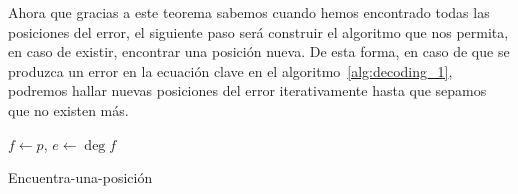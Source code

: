 Ahora que gracias a este teorema sabemos cuando hemos encontrado todas las posiciones del error, el siguiente paso será construir el algoritmo que nos permita, en caso de existir, encontrar una posición nueva. De esta forma, en caso de que se produzca un error en la ecuación clave en el algoritmo~\ref{alg:decoding_1}, podremos hallar nuevas posiciones del error iterativamente hasta que sepamos que no existen más.

\begin{algorithm}[H]
 \label{alg:find_a_position}
 \(f \gets p\),  \(e \gets \deg f\) \\
 \caption{Encuentra-una-posición}
\end{algorithm}


